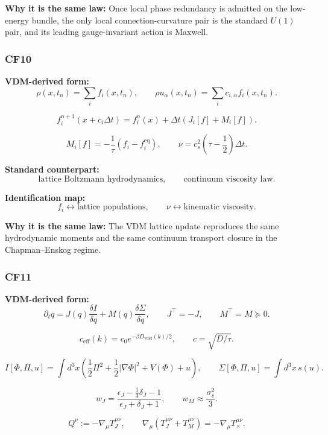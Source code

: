 \documentclass[11pt]{article}
\theoremstyle{definition}
\theoremstyle{plain}
\theoremstyle{remark}
\begin{document}
\textbf{Why it is the same law:} Once local phase redundancy is admitted on
the low-energy bundle, the only local connection-curvature pair is the standard
\(U(1)\) pair, and its leading gauge-invariant action is Maxwell.


\subsubsection*{CF10}
\textbf{VDM-derived form:}
\[
\rho(x,t_n)=\sum_i f_i(x,t_n),
\qquad
\rho u_\alpha(x,t_n)=\sum_i c_{i,\alpha}f_i(x,t_n).
\]

\[
f_i^{n+1}(x+c_i\Delta t)
=
f_i^n(x)+\Delta t(J_i[f]+M_i[f]).
\]

\[
M_i[f]=-\frac1\tau(f_i-f_i^{\mathrm{eq}}),
\qquad
\nu=c_s^2\left(\tau-\frac12\right)\Delta t.
\]

\textbf{Standard counterpart:}
\[
\text{lattice Boltzmann hydrodynamics},
\qquad
\text{continuum viscosity law}.
\]

\textbf{Identification map:}
\[
f_i \leftrightarrow \text{lattice populations},
\qquad
\nu \leftrightarrow \text{kinematic viscosity}.
\]

\textbf{Why it is the same law:} The VDM lattice update reproduces the same
hydrodynamic moments and the same continuum transport closure in the
Chapman--Enskog regime.


\subsubsection*{CF11}
\textbf{VDM-derived form:}
\[
\partial_t q
=
J(q)\frac{\delta I}{\delta q}
+
M(q)\frac{\delta \Sigma}{\delta q},
\qquad
J^\top=-J,
\qquad
M^\top=M\succeq 0.
\]

\[
c_{\mathrm{eff}}(k)=c_0 e^{-\beta D_{\mathrm{void}}(k)/2},
\qquad
c=\sqrt{D/\tau}.
\]

\[
I[\Phi,\Pi,u]
=
\int d^3x
\left(
\frac12\Pi^2 + \frac12|\nabla\Phi|^2 + V(\Phi) + u
\right),
\qquad
\Sigma[\Phi,\Pi,u]=\int d^3x\,s(u).
\]

\[
w_J
=
\frac{\epsilon_J-\frac13\delta_J-1}{\epsilon_J+\delta_J+1},
\qquad
w_M \approx \frac{\sigma_v^2}{3}.
\]

\[
Q^\nu := -\nabla_\mu T_J^{\mu\nu},
\qquad
\nabla_\mu(T_J^{\mu\nu}+T_M^{\mu\nu})
=
-\nabla_\mu T_\times^{\mu\nu}.
\]
\end{document}
